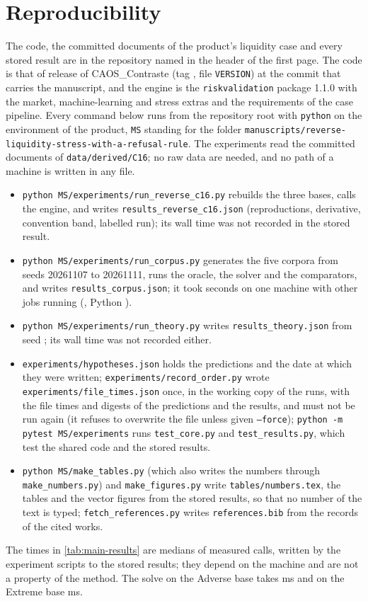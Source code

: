 \section{Reproducibility}
\label{sec:reproducibility}

The code, the committed documents of the product's liquidity case and every stored result are in the repository named in the header of the first page. The code is that of release \docversion{} of CAOS\_Contraste (tag \texttt{\docversion{}}, file \texttt{VERSION}) at the commit that carries the manuscript, and the engine is the \texttt{riskvalidation} package 1.1.0 with the market, machine-learning and stress extras and the requirements of the case pipeline. Every command below runs from the repository root with \texttt{python} on the environment of the product, \texttt{MS} standing for the folder \texttt{manuscripts/\allowbreak reverse-liquidity-stress-with-a-\allowbreak refusal-rule}. The experiments read the committed documents of \texttt{data/derived/C16}; no raw data are needed, and no path of a machine is written in any file. %

\begin{itemize}
\item \texttt{python MS/experiments/run\_reverse\_c16.py} rebuilds the three bases, calls the engine, and writes \texttt{results\_reverse\_c16.json} (reproductions, derivative, convention band, labelled run); its wall time was not recorded in the stored result.
\item \texttt{python MS/experiments/run\_corpus.py} generates the five corpora from seeds 20261107 to 20261111, runs the oracle, the solver and the comparators, and writes \texttt{results\_corpus.json}; it took \kWallSec{} seconds on one machine with other jobs running (\kProc{}, Python \kPy{}).
\item \texttt{python MS/experiments/run\_theory.py} writes \texttt{results\_theory.json} from seed \thSeed{}; its wall time was not recorded either.
\item \texttt{experiments/hypotheses.json} holds the predictions and the date at which they were written; \texttt{experiments/record\_order.py} wrote \texttt{experiments/file\_times.json} once, in the working copy of the runs, with the file times and digests of the predictions and the results, and must not be run again (it refuses to overwrite the file unless given \texttt{--force}); \texttt{python -m pytest MS/experiments} runs \texttt{test\_core.py} and \texttt{test\_results.py}, which test the shared code and the stored results.
\item \texttt{python MS/make\_tables.py} (which also writes the numbers through \texttt{make\_numbers.py}) and \texttt{make\_figures.py} write \texttt{tables/numbers.tex}, the tables and the vector figures from the stored results, so that no number of the text is typed; \texttt{fetch\_references.py} writes \texttt{references.bib} from the records of the cited works.
\end{itemize}

The times in \cref{tab:main-results} are medians of measured calls, written by the experiment scripts to the stored results; they depend on the machine and are not a property of the method. The solve on the Adverse base takes \timeAdvMs{} ms and on the Extreme base \timeExtMs{} ms.
